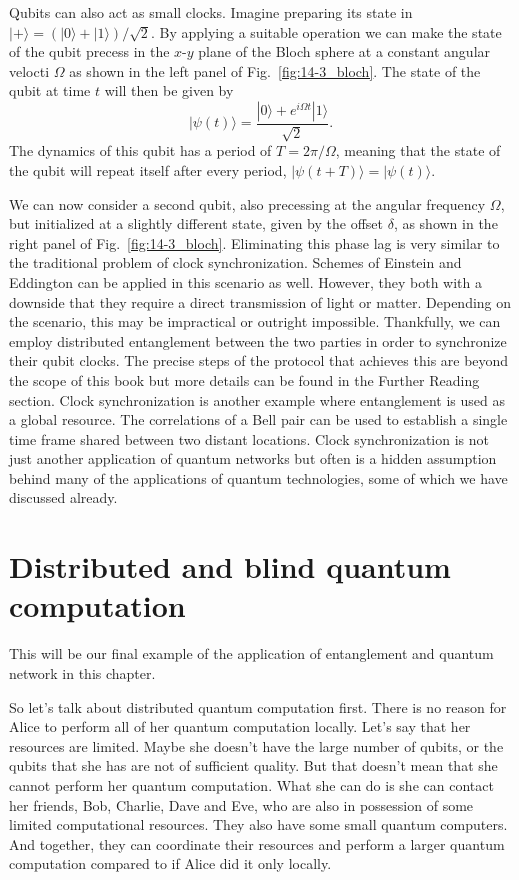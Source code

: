 Qubits can also act as small clocks.
Imagine preparing its state in $|+\rangle = (|0\rangle + |1\rangle) / \sqrt{2}$.
By applying a suitable operation we can make the state of the qubit precess in the $x$-$y$ plane of the Bloch sphere at a constant angular velocti $\Omega$ as shown in the left panel of Fig.~\ref{fig:14-3_bloch}.
The state of the qubit at time $t$ will then be given by
\begin{equation}
    |\psi(t)\rangle = \frac{|0\rangle + e^{i\Omega t} |1\rangle}{\sqrt{2}}.
\end{equation}
The dynamics of this qubit has a period of $T = 2\pi / \Omega$, meaning that the state of the qubit will repeat itself after every period, $|\psi(t+T)\rangle = |\psi(t)\rangle$.

We can now consider a second qubit, also precessing at the angular frequency $\Omega$, but initialized at a slightly different state, given by the offset $\delta$, as shown in the right panel of Fig.~\ref{fig:14-3_bloch}.
Eliminating this phase lag is very similar to the traditional problem of clock synchronization.
Schemes of Einstein and Eddington can be applied in this scenario as well.
However, they both with a downside that they require a direct transmission of light or matter.
Depending on the scenario, this may be impractical or outright impossible.
Thankfully, we can employ distributed entanglement between the two parties in order to synchronize their qubit clocks.
The precise steps of the protocol that achieves this are beyond the scope of this book but more details can be found in the Further Reading section.
Clock synchronization is another example where entanglement is used as a global resource.
The correlations of a Bell pair can be used to establish a single time frame shared between two distant locations.
Clock synchronization is not just another application of quantum networks but often is a hidden assumption behind many of the applications of quantum technologies, some of which we have discussed already.






\section{Distributed and blind quantum computation}
\label{sec:14-4_distributed_bqc}

This will be our final example of the application of entanglement and quantum network in this chapter.

So let's talk about distributed quantum computation first. There is no reason for Alice to perform all of her quantum computation locally. Let's say that her resources are limited. Maybe she doesn't have the large number of qubits, or the qubits that she has are not of sufficient quality. But that doesn't mean that she cannot perform her quantum computation. What she can do is she can contact her friends, Bob, Charlie, Dave and Eve, who are also in possession of some limited computational resources. They also have some small quantum computers. And together, they can coordinate their resources and perform a larger quantum computation compared to if Alice did it only locally.

